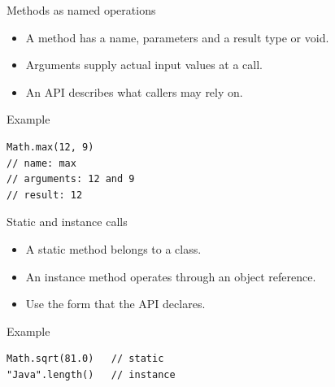 \documentclass[10pt,aspectratio=169]{beamer}
\begin{document}
\begin{frame}[fragile,t]{Methods as named operations}
\begin{itemize}
\item A method has a name, parameters and a result type or void.
\item Arguments supply actual input values at a call.
\item An API describes what callers may rely on.
\end{itemize}
\vspace{1mm}\begin{block}{Example}
\begin{lstlisting}
Math.max(12, 9)
// name: max
// arguments: 12 and 9
// result: 12
\end{lstlisting}
\end{block}
\end{frame}

\begin{frame}[fragile,t]{Static and instance calls}
\begin{itemize}
\item A static method belongs to a class.
\item An instance method operates through an object reference.
\item Use the form that the API declares.
\end{itemize}
\vspace{1mm}\begin{block}{Example}
\begin{lstlisting}
Math.sqrt(81.0)   // static
"Java".length()   // instance
\end{lstlisting}
\end{block}
\end{frame}
\end{document}
